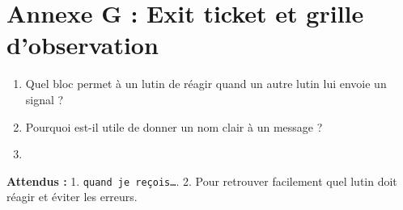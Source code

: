 \documentclass[11pt,a4paper]{article}
\begin{document}
\newpage
\section*{Annexe G : Exit ticket et grille d'observation}

\begin{enumerate}
 \item Quel bloc permet à un lutin de réagir quand un autre lutin lui envoie un signal ?\\ \lig
 \item Pourquoi est-il utile de donner un nom clair à un message ?\\ \lig
 \item \autoeval
\end{enumerate}
\textbf{Attendus :} 1. \texttt{quand je reçois\ldots}. 2. Pour retrouver facilement quel lutin doit réagir et éviter les erreurs.

\bigskip
{}
\end{document}
